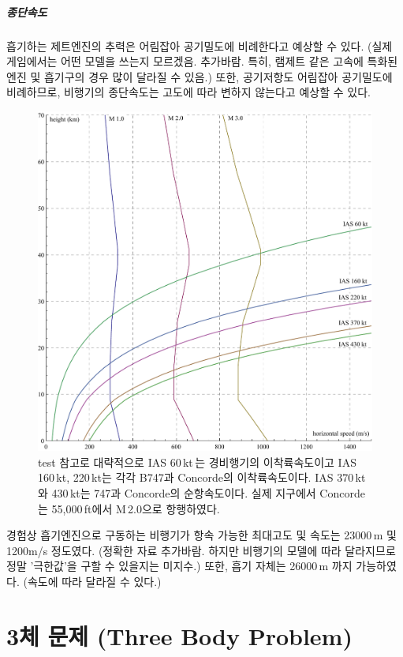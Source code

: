 \documentclass[9pt]{amsbook}
\begin{document}
\paragraph{종단속도}
흡기하는 제트엔진의 추력은 어림잡아 공기밀도에 비례한다고 예상할 수 있다. (실제 게임에서는 어떤 모델을 쓰는지 모르겠음. 추가바람. 특히, 램제트 같은 고속에 특화된 엔진 및 흡기구의 경우 많이 달라질 수 있음.) 또한, 공기저항도 어림잡아 공기밀도에 비례하므로, 비행기의 종단속도는 고도에 따라 변하지 않는다고 예상할 수 있다.
\begin{figure}
\includegraphics[width=\textwidth]{ias.pdf}
\caption{test 참고로 대략적으로 IAS 60\,kt\,는 경비행기의 이착륙속도이고 IAS 160\,kt, 220\,kt는 각각 B747과 Concorde의 이착륙속도이다. IAS 370\,kt와 430\,kt는 747과 Concorde의 순항속도이다. 실제 지구에서 Concorde는 55,000\,ft에서 M\,2.0으로 항행하였다.}
\end{figure}

경험상 흡기엔진으로 구동하는 비행기가 항속 가능한 최대고도 및 속도는 23000\,m 및 1200m/s 정도였다. (정확한 자료 추가바람. 하지만 비행기의 모델에 따라 달라지므로 정말 '극한값'을 구할 수 있을지는 미지수.) 
또한, 흡기 자체는 26000\,m 까지 가능하였다. (속도에 따라 달라질 수 있다.)

\chapter{3체 문제 (Three Body Problem)}
\end{document}
